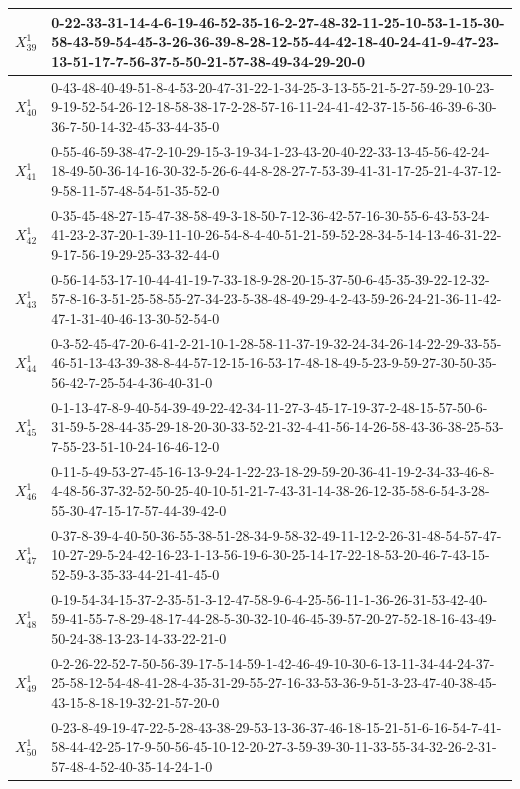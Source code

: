 \begin{landscape}
{\begin{tabularx}{\linewidth}{|c|X|}
        $X_{39}^{1}$ & 0-22-33-31-14-4-6-19-46-52-35-16-2-27-48-32-11-25-10-53-1-15-30-58-43-59-54-45-3-26-36-39-8-28-12-55-44-42-18-40-24-41-9-47-23-13-51-17-7-56-37-5-50-21-57-38-49-34-29-20-0 \\ \hline
        $X_{40}^{1}$ & 0-43-48-40-49-51-8-4-53-20-47-31-22-1-34-25-3-13-55-21-5-27-59-29-10-23-9-19-52-54-26-12-18-58-38-17-2-28-57-16-11-24-41-42-37-15-56-46-39-6-30-36-7-50-14-32-45-33-44-35-0 \\ \hline
        $X_{41}^{1}$ & 0-55-46-59-38-47-2-10-29-15-3-19-34-1-23-43-20-40-22-33-13-45-56-42-24-18-49-50-36-14-16-30-32-5-26-6-44-8-28-27-7-53-39-41-31-17-25-21-4-37-12-9-58-11-57-48-54-51-35-52-0 \\ \hline
        $X_{42}^{1}$ & 0-35-45-48-27-15-47-38-58-49-3-18-50-7-12-36-42-57-16-30-55-6-43-53-24-41-23-2-37-20-1-39-11-10-26-54-8-4-40-51-21-59-52-28-34-5-14-13-46-31-22-9-17-56-19-29-25-33-32-44-0 \\ \hline
        $X_{43}^{1}$ & 0-56-14-53-17-10-44-41-19-7-33-18-9-28-20-15-37-50-6-45-35-39-22-12-32-57-8-16-3-51-25-58-55-27-34-23-5-38-48-49-29-4-2-43-59-26-24-21-36-11-42-47-1-31-40-46-13-30-52-54-0 \\ \hline
        $X_{44}^{1}$ & 0-3-52-45-47-20-6-41-2-21-10-1-28-58-11-37-19-32-24-34-26-14-22-29-33-55-46-51-13-43-39-38-8-44-57-12-15-16-53-17-48-18-49-5-23-9-59-27-30-50-35-56-42-7-25-54-4-36-40-31-0 \\ \hline
        $X_{45}^{1}$ & 0-1-13-47-8-9-40-54-39-49-22-42-34-11-27-3-45-17-19-37-2-48-15-57-50-6-31-59-5-28-44-35-29-18-20-30-33-52-21-32-4-41-56-14-26-58-43-36-38-25-53-7-55-23-51-10-24-16-46-12-0 \\ \hline
        $X_{46}^{1}$ & 0-11-5-49-53-27-45-16-13-9-24-1-22-23-18-29-59-20-36-41-19-2-34-33-46-8-4-48-56-37-32-52-50-25-40-10-51-21-7-43-31-14-38-26-12-35-58-6-54-3-28-55-30-47-15-17-57-44-39-42-0 \\ \hline
        $X_{47}^{1}$ & 0-37-8-39-4-40-50-36-55-38-51-28-34-9-58-32-49-11-12-2-26-31-48-54-57-47-10-27-29-5-24-42-16-23-1-13-56-19-6-30-25-14-17-22-18-53-20-46-7-43-15-52-59-3-35-33-44-21-41-45-0 \\ \hline
        $X_{48}^{1}$ & 0-19-54-34-15-37-2-35-51-3-12-47-58-9-6-4-25-56-11-1-36-26-31-53-42-40-59-41-55-7-8-29-48-17-44-28-5-30-32-10-46-45-39-57-20-27-52-18-16-43-49-50-24-38-13-23-14-33-22-21-0 \\ \hline
        $X_{49}^{1}$ & 0-2-26-22-52-7-50-56-39-17-5-14-59-1-42-46-49-10-30-6-13-11-34-44-24-37-25-58-12-54-48-41-28-4-35-31-29-55-27-16-33-53-36-9-51-3-23-47-40-38-45-43-15-8-18-19-32-21-57-20-0 \\ \hline
        $X_{50}^{1}$ & 0-23-8-49-19-47-22-5-28-43-38-29-53-13-36-37-46-18-15-21-51-6-16-54-7-41-58-44-42-25-17-9-50-56-45-10-12-20-27-3-59-39-30-11-33-55-34-32-26-2-31-57-48-4-52-40-35-14-24-1-0 \\ \hline
    \end{tabularx}
    }
\end{landscape}
\pagebreak



